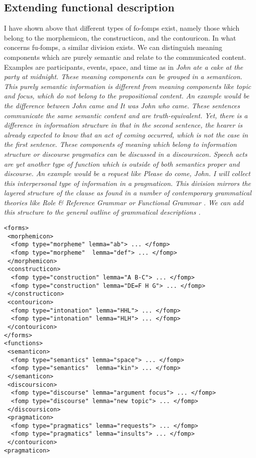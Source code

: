 \subsection{Extending functional description}
I have shown above that different types of fo-fomps exist, namely those which belong to the morphemicon, the constructicon, and the contouricon. In what concerns fu-fomps, a similar division exists. We can distinguish meaning components which are purely semantic and relate to the communicated content. Examples are participants, events, space, and time as in \em John ate a cake at the party at midnight\em. These meaning components can be grouped in a \em semanticon\em. This purely semantic information is different from meaning components like topic and focus, which do not belong to the propositional content. An example would be the difference between \em John came \em and \em It was John who came\em. These sentences communicate the same semantic content and are truth-equivalent. Yet, there is a difference in information structure in that in the second sentence, the hearer is already expected to know that an act of coming occurred, which is not the case in the first sentence. These components of meaning which belong to information structure or discourse pragmatics can be discussed in a \em discoursicon\em. Speech acts are yet another type of function which is outside of both semantics proper and discourse. An example would be a request like \em Please do come, John\em. I will collect this interpersonal type of information in a \em pragmaticon\em. This division mirrors the layered structure of the clause as found in a number of contemporary grammatical theories like Role \& Reference Grammar  \citep{FoleyEtAl1984,VanValinEtAl1997rrg} or Functional Grammar \citep{Hengeveld1989,HengeveldEtAl2008fdg}. We can add this structure to the general outline of grammatical descriptions .
\ea\label{xml:fufofomp}
\begin{verbatim} 
<forms>
 <morphemicon>
  <fomp type="morpheme" lemma="ab"> ... </fomp>
  <fomp type="morpheme"  lemma="def"> ... </fomp>
 </morphemicon>
 <constructicon>
  <fomp type="construction" lemma="A B-C"> ... </fomp>
  <fomp type="construction" lemma="DE=F H G"> ... </fomp>
 </constructicon>
 <contouricon>
  <fomp type="intonation" lemma="HHL"> ... </fomp>
  <fomp type="intonation" lemma="HLH"> ... </fomp>
 </contouricon>
</forms>
<functions>
 <semanticon>
  <fomp type="semantics" lemma="space"> ... </fomp>
  <fomp type="semantics"  lemma="kin"> ... </fomp>
 </semanticon>
 <discoursicon>
  <fomp type="discourse" lemma="argument focus"> ... </fomp>
  <fomp type="discourse" lemma="new topic"> ... </fomp>
 </discoursicon>
 <pragmaticon>
  <fomp type="pragmatics" lemma="requests"> ... </fomp>
  <fomp type="pragmatics" lemma="insults"> ... </fomp>
 </contouricon>
<pragmaticon>
\end{verbatim} 
\z


